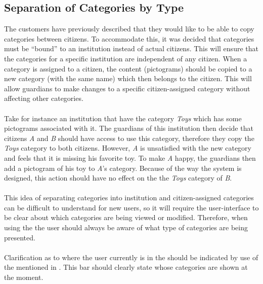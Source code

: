 \subsection{Separation of Categories by Type}
The customers have previously described that they would like to be able to copy categories between citizens. To accommodate this, it was decided that categories must be ``bound'' to an institution instead of actual citizens. This will ensure that the categories for a specific institution are independent of any citizen. When a category is assigned to a citizen, the content (pictograms) should be copied to a new category (with the same name) which then belongs to the citizen. This will allow guardians to make changes to a specific citizen-assigned category without affecting other categories. 
\\\\
Take for instance an institution that have the category \emph{Toys} which has some pictograms associated with it. The guardians of this institution then decide that citizens \emph{A} and \emph{B} should have access to use this category, therefore they copy the \emph{Toys} category to both citizens. However, \emph{A} is unsatisfied with the new category and feels that it is missing his favorite toy. To make \emph{A} happy, the guardians then add a pictogram of his toy to \emph{A}'s category. Because of the way the system is designed, this action should have no effect on the the \emph{Toys} category of \emph{B}.
\\\\
This idea of separating categories into institution and citizen-assigned categories can be difficult to understand for new users, so it will require the user-interface to be clear about which categories are being viewed or modified. Therefore, when using the \ct the user should always be aware of what type of categories are being presented.
\\\\
Clarification as to where the user currently is in the \ct should be indicated by use of the  mentioned in . This bar should clearly state whose categories are shown at the moment.

